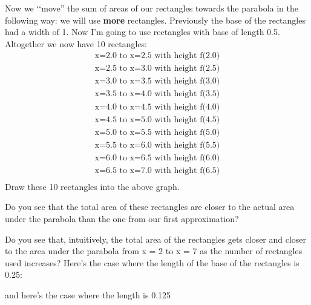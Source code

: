 Now we \lq\lq move'' the sum of areas of our rectangles towards the parabola
in the following way: we will use \textbf{more} rectangles. Previously the
base of the rectangles had a width of 1. Now I'm going
to use rectangles with base of length 0.5. Altogether we now have 10
rectangles:
\begin{align*}
\text{x=2.0 to x=2.5 with height f(2.0)}\\
\text{x=2.5 to x=3.0 with height f(2.5)}\\
\text{x=3.0 to x=3.5 with height f(3.0)}\\
\text{x=3.5 to x=4.0 with height f(3.5)}\\
\text{x=4.0 to x=4.5 with height f(4.0)}\\
\text{x=4.5 to x=5.0 with height f(4.5)}\\
\text{x=5.0 to x=5.5 with height f(5.0)}\\
\text{x=5.5 to x=6.0 with height f(5.5)}\\
\text{x=6.0 to x=6.5 with height f(6.0)}\\
\text{x=6.5 to x=7.0 with height f(6.5)}\\
\end{align*}
Draw these 10 rectangles into the above graph.


Do you see that the total area of these rectangles are closer to the
actual area under the parabola than the one from our first
approximation?

Do you see that, intuitively, the total area of the rectangles gets
closer and closer to the area under the parabola from x = 2 to x = 7 as
the number of rectangles used increases? Here's the case
where the length of the base of the rectangles is 0.25:

and here's the case where the length is 0.125


